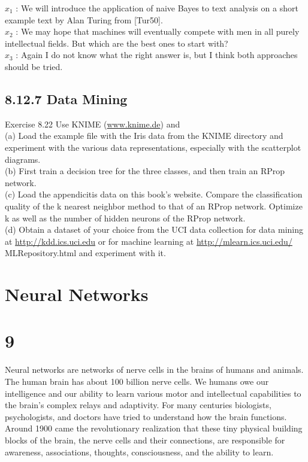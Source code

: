 \documentclass[10pt]{book}
\begin{document}
\begin{center}
\begin{enumerate}
\begin{center}
\begin{center}
\begin{center}
$x_{1}$ : We will introduce the application of naive Bayes to text analysis on a short example text by Alan Turing from [Tur50].\\
$x_{2}$ : We may hope that machines will eventually compete with men in all purely intellectual fields. But which are the best ones to start with?\\
$x_{3}$ : Again I do not know what the right answer is, but I think both approaches should be tried.

\subsection*{8.12.7 Data Mining}
Exercise 8.22 Use KNIME (\href{http://www.knime.de}{www.knime.de}) and\\
(a) Load the example file with the Iris data from the KNIME directory and experiment with the various data representations, especially with the scatterplot diagrams.\\
(b) First train a decision tree for the three classes, and then train an RProp network.\\
(c) Load the appendicitis data on this book's website. Compare the classification quality of the k nearest neighbor method to that of an RProp network. Optimize k as well as the number of hidden neurons of the RProp network.\\
(d) Obtain a dataset of your choice from the UCI data collection for data mining at \href{http://kdd.ics.uci.edu}{http://kdd.ics.uci.edu} or for machine learning at \href{http://mlearn.ics.uci.edu/}{http://mlearn.ics.uci.edu/} MLRepository.html and experiment with it.


\section*{Neural Networks}
\section*{9}
Neural networks are networks of nerve cells in the brains of humans and animals. The human brain has about 100 billion nerve cells. We humans owe our intelligence and our ability to learn various motor and intellectual capabilities to the brain's complex relays and adaptivity. For many centuries biologists, psychologists, and doctors have tried to understand how the brain functions. Around 1900 came the revolutionary realization that these tiny physical building blocks of the brain, the nerve cells and their connections, are responsible for awareness, associations, thoughts, consciousness, and the ability to learn.


\end{center}
\end{center}
\end{center}
\end{enumerate}
\end{center}
\end{document}
